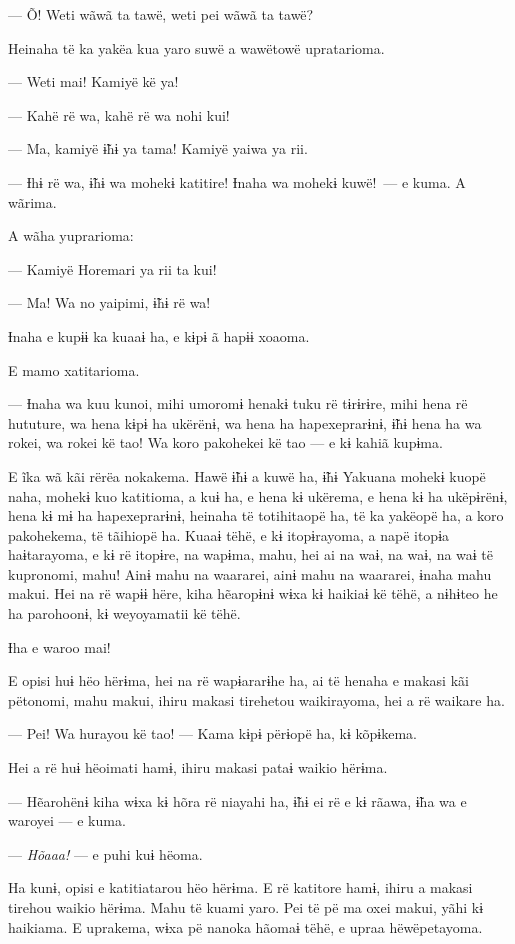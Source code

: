 --- Õ! Weti wãwã ta tawë, weti pei wãwã ta tawë?

Heinaha të ka yakëa kua yaro suwë a wawëtowë upratarioma. 

--- Weti mai! Kamiyë kë ya!

--- Kahë rë wa, kahë rë wa nohi kui!

--- Ma, kamiyë ɨ̃hɨ ya tama! Kamiyë yaiwa ya rii.

--- Ɨhɨ rë wa, ɨ̃hɨ wa mohekɨ katitire! Ɨnaha wa mohekɨ kuwë!~--- e kuma.
A wãrima. 

A wãha yuprarioma: 

--- Kamiyë Horemari ya rii ta kui!

--- Ma! Wa no yaipimi, ɨ̃hɨ rë wa! 

Ɨnaha e kupɨɨ ka kuaaɨ ha, e kɨpɨ ã hapɨɨ xoaoma. 

E mamo xatitarioma. 

--- Ɨnaha wa kuu kunoi, mihi umoromɨ henakɨ tuku rë tɨrɨrɨre, mihi hena
rë hututure, wa hena kɨpɨ ha ukërënɨ, wa hena ha hapexeprarɨnɨ, ɨ̃hɨ hena
ha wa rokei, wa rokei kë tao! Wa koro pakohekei kë tao --- e kɨ kahiã
kupɨma.

E ĩka wã kãi rërëa nokakema. Hawë ɨ̃hɨ a kuwë ha, ɨ̃hɨ Yakuana mohekɨ
 kuopë naha, mohekɨ kuo katitioma, a kuɨ ha, e hena kɨ ukërema, e hena kɨ
 ha ukëpɨrënɨ, hena kɨ mɨ ha hapexeprarɨnɨ, heinaha të totihitaopë ha, të
 ka yakëopë ha, a koro pakohekema, të tãihiopë ha. Kuaaɨ tëhë, e kɨ
 itopɨrayoma, a napë itopɨa haɨtarayoma, e kɨ rë itopɨre, na wapɨma,
 mahu, hei ai na waɨ, na waɨ, na waɨ të kupronomi, mahu! Ainɨ mahu na
 waararei, ainɨ mahu na waararei, ɨnaha mahu makui. Hei na rë wapɨɨ hëre,
 kiha hẽaropɨnɨ wɨxa kɨ haikiaɨ kë tëhë, a nɨhɨteo he ha parohoonɨ, kɨ
 weyoyamatii kë tëhë. 

Ɨha e waroo mai! 

E opisi huɨ hëo hërɨma, hei na rë wapɨararɨhe ha, ai të henaha e makasi
 kãi pëtonomi, mahu makui, ihiru makasi tirehetou waikirayoma, hei a rë
 waikare ha. 

--- Pei! Wa hurayou kë tao! --- Kama kɨpɨ përɨopë ha, kɨ kõpɨkema. 

Hei a rë huɨ hëoimati hamɨ, ihiru makasi pataɨ waikio hërɨma. 

--- Hẽarohënɨ kiha wɨxa kɨ hõra rë niayahi ha, ɨ̃hɨ ei rë e kɨ rãawa, ɨ̃ha
 wa e waroyei --- e kuma. 

--- \textit{Hõaaa!} --- e puhi kuɨ hëoma. 

Ha kunɨ, opisi e katitiatarou hëo hërɨma. E rë katitore hamɨ, ihiru a
makasi tirehou waikio hërɨma. Mahu të kuami yaro. Pei të pë ma oxei
makui, yãhi kɨ haikiama. E uprakema, wɨxa pë nanoka hãomaɨ tëhë, e upraa
hëwëpetayoma. 

